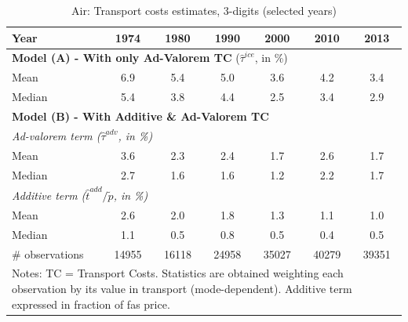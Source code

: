 \documentclass[a4paper,11pt]{article}
\begin{document}
\begin{table}[htbp]
  \centering
  \caption{Air: Transport costs estimates, 3-digits (selected years)}
\begin{center}
    \begin{tabular}{l|cccccc}
\hline\hline
Year & 1974  & 1980  & 1990  & 2000  & 2010  & 2013   \\
\hline
\multicolumn{7}{l}{\textbf{Model (A) - With only Ad-Valorem TC} ($\widehat{\tau}^{ice}$, in \%)}     \\
\hline
Mean  & 6.9& 5.4 &5.0 & 3.6 & 4.2 & 3.4  \\
Median & 5.4 & 3.8 & 4.4 & 2.5 & 3.4 & 2.9  \\
\hline
\multicolumn{7}{l}{\textbf{Model (B) - With Additive \& Ad-Valorem TC}}    \\
\hline
\multicolumn{7}{l}{\textit{Ad-valorem term ($\widehat{\tau}^{adv}$, in \%)}}  \\ \hline
Mean & 3.6 & 2.3 & 2.4 &1.7 & 2.6 & 1.7  \\
Median & 2.7 & 1.6 & 1.6 & 1.2 & 2.2 & 1.7 \\

\hline
\multicolumn{7}{l}{\textit{Additive term ($\widehat{t}^{add}/\widetilde{p}$, in \%)}}     \\ \hline
Mean & 2.6 & 2.0 & 1.8 & 1.3 & 1.1 & 1.0  \\
Median & 1.1 & 0.5 & 0.8 & 0.5 & 0.4 & 0.5  \\
\hline
\# observations & 14955 & 16118 & 24958 & 35027 & 40279 & 39351  \\
\hline\hline
\multicolumn{7}{l}{\parbox[l]{11cm}{ \vspace{7pt}\scriptsize{Notes: TC = Transport Costs. Statistics are obtained weighting each observation by its value in transport (mode-dependent). Additive term expressed in fraction of fas price.}}}
\end{tabular}%
\end{center}
\label{tab:result_air_3d_detail}
\end{table}%
\end{document}
